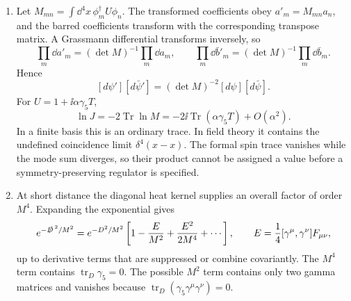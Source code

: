 
\begin{enumerate}
  \begin{enumerate}
    \item[(a)]
    Let
    \(M_{mn}=\int \dd^4x\,\phi_m^\dagger U\phi_n\).  The transformed
    coefficients obey \(a'_m=M_{mn}a_n\), and the barred coefficients
    transform with the corresponding transpose matrix.  A Grassmann
    differential transforms inversely, so
    \[
      \prod_m \dd a'_m=(\det M)^{-1}\prod_m \dd a_m,\qquad
      \prod_m \dd\bar b'_m=(\det M)^{-1}\prod_m \dd\bar b_m.
    \]
    Hence
    \[
      [d\psi'][d\bar\psi']=(\det M)^{-2}[d\psi][d\bar\psi].
    \]
    For \(U=1+\ii\alpha\gamma_5T\),
    \[
      \ln J=-2\operatorname{Tr}\ln M
        =-2\ii\operatorname{Tr}(\alpha\gamma_5T)+O(\alpha^2).
    \]
    In a finite basis this is an ordinary trace.  In field theory it
    contains the undefined coincidence limit
    \(\delta^4(x-x)\).  The formal spin trace vanishes while the mode sum
    diverges, so their product cannot be assigned a value before a
    symmetry-preserving regulator is specified.
    \item[(b)]
    At short distance the diagonal heat kernel supplies an overall factor
    of order \(M^4\).  Expanding the exponential gives
    \[
      e^{-\slashed D^{\,2}/M^2}
        =e^{-D^2/M^2}
         \left[
          1-\frac{E}{M^2}
          +\frac{E^2}{2M^4}+\cdots
         \right],
      \qquad
      E=\frac14[\gamma^\mu,\gamma^\nu]F_{\mu\nu},
    \]
    up to derivative terms that are suppressed or combine covariantly.
    The \(M^4\) term contains
    \(\operatorname{tr}_D\gamma_5=0\).  The possible \(M^2\) term
    contains only two gamma matrices and vanishes because
    \(\operatorname{tr}_D(\gamma_5\gamma^\mu\gamma^\nu)=0\).


\end{enumerate}
\end{enumerate}
